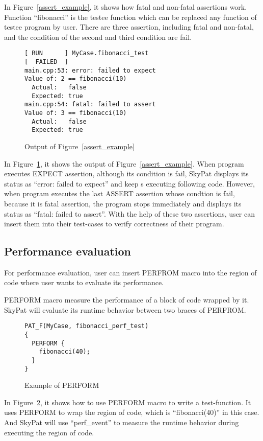 \documentclass[final]{ols}
\begin{document}
In Figure~\ref{assert_example}, it shows how fatal and non-fatal assertions work.
Function ``fibonacci'' is the testee function which can be replaced any function of testee program by user.
There are three assertion, including fatal and non-fatal, and the condition of the second and third condition are fail.

\begin{figure}[h]
\lstset{language=sh}
\begin{lstlisting}[frame=single]
[ RUN      ] MyCase.fibonacci_test
[  FAILED  ]
main.cpp:53: error: failed to expect
Value of: 2 == fibonacci(10)
  Actual:   false
  Expected: true
main.cpp:54: fatal: failed to assert
Value of: 3 == fibonacci(10)
  Actual:   false
  Expected: true
\end{lstlisting}
\caption{Output of Figure~\ref{assert_example}}
\label{assert_example_output}
\end{figure}

In Figure~\ref{assert_example_output}, it shows the output of Figure~\ref{assert_example}.
When program executes EXPECT assertion, although its condition is fail, SkyPat displays its status as ``error: failed to expect'' and keep s executing following code.
However, when program executes the last ASSERT assertion whose condtion is fail, because it is fatal assertion, the program stops immediately and displays its status as ``fatal: failed to assert''.
With the help of these two assertions, user can insert them into their test-cases to verify correctness of their program.

\subsection{Performance evaluation}
For performance evaluation, user can insert PERFROM macro into the region of code where user wants to evaluate its performance.

PERFORM macro measure the performance of a block of code wrapped by it.
SkyPat will evaluate its runtime behavior between two braces of PERFROM.

\begin{figure}[h]
\lstset{language=C++}
\begin{lstlisting}[frame=single]
PAT_F(MyCase, fibonacci_perf_test)
{
  PERFORM {
    fibonacci(40);
  }
}
\end{lstlisting}
\caption{Example of PERFORM}
\label{perform_example}
\end{figure}

In Figure~\ref{perform_example}, it shows how to use PERFORM macro to write a test-function.
It uses PERFORM to wrap the region of code, which is ``fibonacci(40)'' in this case.
And SkyPat will use ``perf\_event'' to measure the runtime behavior during executing the region of code.
\end{document}
